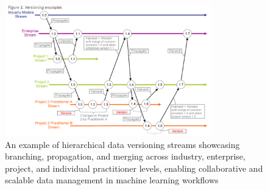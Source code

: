 \begin{figure}[H]
    \centering
    \includegraphics[width=0.8\textwidth]{fig/dv-advantages.png}
    \caption{An example of hierarchical data versioning 
        streams showcasing branching, propagation, and 
        merging across industry, enterprise, project, and 
        individual practitioner levels, enabling collaborative 
        and scalable data management in machine learning 
        workflows \cite{aimultiple}}
    \label{fig:dv-advantages}
\end{figure}
